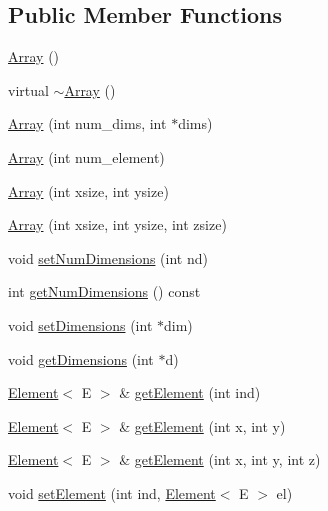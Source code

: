 \subsection*{Public Member Functions}
\begin{DoxyCompactItemize}
\item 
\hyperlink{classbridges_1_1_array_a958421b86ff55303b5fc7d505109f9fe}{Array} ()
\item 
virtual \hyperlink{classbridges_1_1_array_aa80b2d2ebc4c27e74a8eaaeb6907b474}{$\sim$\+Array} ()
\item 
\hyperlink{classbridges_1_1_array_a25ff771f9ba7f365465f309ed2dd3688}{Array} (int num\+\_\+dims, int $\ast$dims)
\item 
\hyperlink{classbridges_1_1_array_a859819bc374aa90fcd84b1314034fbbf}{Array} (int num\+\_\+element)
\item 
\hyperlink{classbridges_1_1_array_a13b26fc4d2ccb19b277b2acc615efce2}{Array} (int xsize, int ysize)
\item 
\hyperlink{classbridges_1_1_array_a3504e71cacffd343edf8b9ea16f75eb4}{Array} (int xsize, int ysize, int zsize)
\item 
void \hyperlink{classbridges_1_1_array_a6b91612bb7b89a563571fd1ea417ef2a}{set\+Num\+Dimensions} (int nd)
\item 
int \hyperlink{classbridges_1_1_array_a14dbc2f6478b9b75dfa7c91f67afb90e}{get\+Num\+Dimensions} () const 
\item 
void \hyperlink{classbridges_1_1_array_a4e179915ab7820bbafe9b3433656b182}{set\+Dimensions} (int $\ast$dim)
\item 
void \hyperlink{classbridges_1_1_array_ae195a6f06157e82c68483ff636e30f5e}{get\+Dimensions} (int $\ast$d)
\item 
\hyperlink{classbridges_1_1_element}{Element}$<$ E $>$ \& \hyperlink{classbridges_1_1_array_ac5ff703692153e1831cbea6edd3007e7}{get\+Element} (int ind)
\item 
\hyperlink{classbridges_1_1_element}{Element}$<$ E $>$ \& \hyperlink{classbridges_1_1_array_acd5e730e0369b1fa699a5907e889f213}{get\+Element} (int x, int y)
\item 
\hyperlink{classbridges_1_1_element}{Element}$<$ E $>$ \& \hyperlink{classbridges_1_1_array_a7006eeac547c391cb7e8eb19c56ae9f6}{get\+Element} (int x, int y, int z)
\item 
void \hyperlink{classbridges_1_1_array_aa4609a029a5c988c0bb2908030fd9dc5}{set\+Element} (int ind, \hyperlink{classbridges_1_1_element}{Element}$<$ E $>$ el)
\item 

\end{DoxyCompactItemize}

